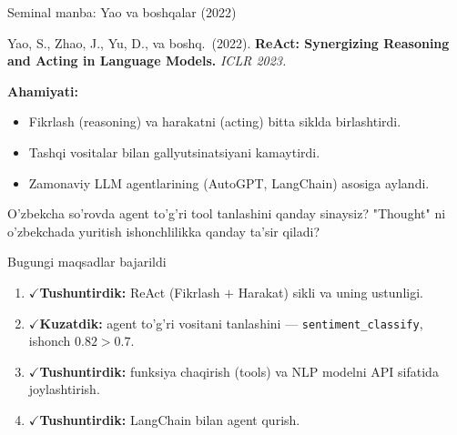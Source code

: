 \documentclass[aspectratio=169,11pt]{beamer}
\newcommand{\bajarildi}{{\color{deepgreen}\large$\checkmark$}\;}
\begin{document}
\begin{frame}{Seminal manba: Yao va boshqalar (2022)}
  \begin{tcolorbox}[defbox,title=Manba]
    \small
    Yao, S., Zhao, J., Yu, D., va boshq.\ (2022). \textbf{ReAct: Synergizing
    Reasoning and Acting in Language Models.} \textit{ICLR 2023.}
  \end{tcolorbox}
  \vspace{5pt}
  \textbf{Ahamiyati:}
  \begin{itemize}\small\setlength\itemsep{3pt}
    \item Fikrlash (reasoning) va harakatni (acting) bitta siklda birlashtirdi.
    \item Tashqi vositalar bilan gallyutsinatsiyani kamaytirdi.
    \item Zamonaviy LLM agentlarining (AutoGPT, LangChain) asosiga aylandi.
  \end{itemize}
  \vspace{5pt}
  \begin{tcolorbox}[warnbox,title=Muhokama savoli (P15 gacha o'ylang)]
    \small
    O'zbekcha so'rovda agent to'g'ri tool tanlashini qanday sinaysiz? "Thought"
    ni o'zbekchada yuritish ishonchlilikka qanday ta'sir qiladi?
  \end{tcolorbox}
\end{frame}

\begin{frame}{Bugungi maqsadlar bajarildi}
  \begin{enumerate}\setlength\itemsep{7pt}
    \item \bajarildi \textbf{Tushuntirdik:} ReAct (Fikrlash $+$ Harakat) sikli va
          uning ustunligi.
    \item \bajarildi \textbf{Kuzatdik:} agent to'g'ri vositani tanlashini ---
          \texttt{sentiment\_classify}, ishonch $0.82 > 0.7$.
    \item \bajarildi \textbf{Tushuntirdik:} funksiya chaqirish (tools) va NLP
          modelni API sifatida joylashtirish.
    \item \bajarildi \textbf{Tushuntirdik:} LangChain bilan agent qurish.
  \end{enumerate}
\end{frame}
\end{document}
